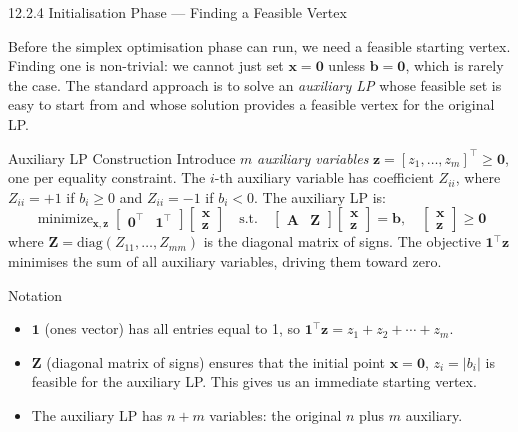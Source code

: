 \documentclass[aspectratio=169,10pt]{beamer}
\DeclareMathOperator*{\minimize}{minimize}
\newcommand{\xv}{\mathbf{x}}
\newcommand{\bv}{\mathbf{b}}
\newcommand{\Av}{\mathbf{A}}
\newcommand{\zv}{\mathbf{z}}
\begin{document}
\begin{frame}[allowframebreaks]{12.2.4 Initialisation Phase --- Finding a Feasible Vertex}

Before the simplex optimisation phase can run, we need a feasible starting vertex.
Finding one is non-trivial: we cannot just set $\xv = \mathbf{0}$ unless
$\bv = \mathbf{0}$, which is rarely the case.  The standard approach is to solve an
\emph{auxiliary LP} whose feasible set is easy to start from and whose solution
provides a feasible vertex for the original LP.

\begin{block}{Auxiliary LP Construction}
Introduce $m$ \emph{auxiliary variables} $\zv = [z_1, \ldots, z_m]^\top \ge \mathbf{0}$,
one per equality constraint.  The $i$-th auxiliary variable has coefficient $Z_{ii}$,
where $Z_{ii} = +1$ if $b_i \ge 0$ and $Z_{ii} = -1$ if $b_i < 0$.  The auxiliary LP is:
\[
  \minimize_{\xv,\zv}
  \begin{bmatrix}\mathbf{0}^\top & \mathbf{1}^\top\end{bmatrix}
  \begin{bmatrix}\xv\\\zv\end{bmatrix}
  \quad\text{s.t.}\quad
  \begin{bmatrix}\Av & \mathbf{Z}\end{bmatrix}
  \begin{bmatrix}\xv\\\zv\end{bmatrix}
  = \bv,\quad
  \begin{bmatrix}\xv\\\zv\end{bmatrix} \ge \mathbf{0}
\]
where $\mathbf{Z} = \text{diag}(Z_{11}, \ldots, Z_{mm})$ is the diagonal matrix of
signs.  The objective $\mathbf{1}^\top\zv$ minimises the sum of all auxiliary
variables, driving them toward zero.
\end{block}

\begin{block}{Notation}
\begin{itemize}
  \item $\mathbf{1}$ (ones vector) has all entries equal to 1, so
        $\mathbf{1}^\top\zv = z_1 + z_2 + \cdots + z_m$.
  \item $\mathbf{Z}$ (diagonal matrix of signs) ensures that the initial point
        $\xv = \mathbf{0}$, $z_i = |b_i|$ is feasible for the auxiliary LP.
        This gives us an immediate starting vertex.
  \item The auxiliary LP has $n + m$ variables: the original $n$ plus $m$ auxiliary.
\end{itemize}
\end{block}


\end{frame}
\end{document}
